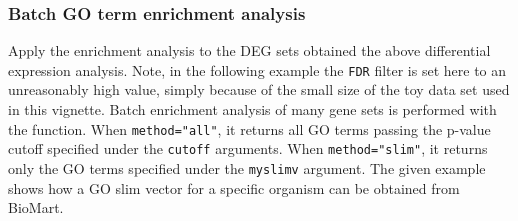 \documentclass{article}\usepackage[]{graphicx}\usepackage[]{color}
\newcommand{\Rfunarg}[1]{{\texttt{#1}}}
\begin{document}
\subsubsection{Batch GO term enrichment analysis}
Apply the enrichment analysis to the DEG sets obtained the above differential expression analysis. Note, in the following example the \Rfunarg{FDR} filter is set here to an unreasonably high value, simply because of the small size of the toy data set used in this vignette. Batch enrichment analysis of many gene sets is performed with the  function. When \Rfunarg{method="all"}, it returns all GO terms passing the p-value cutoff specified under the \Rfunarg{cutoff} arguments. When \Rfunarg{method="slim"}, it returns only the GO terms specified under the \Rfunarg{myslimv} argument. The given example shows how a GO slim vector for a specific organism can be obtained from BioMart.  
\end{document}
